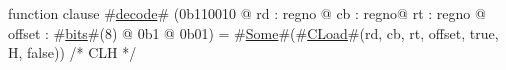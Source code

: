 function clause #\hyperref[zdecode]{decode}# (0b110010 @ rd : regno @ cb : regno@ rt : regno @ offset : #\hyperref[zbits]{bits}#(8) @ 0b1 @ 0b01) = #\hyperref[zSome]{Some}#(#\hyperref[zCLoad]{CLoad}#(rd, cb, rt, offset, true,  H, false)) /* CLH */
